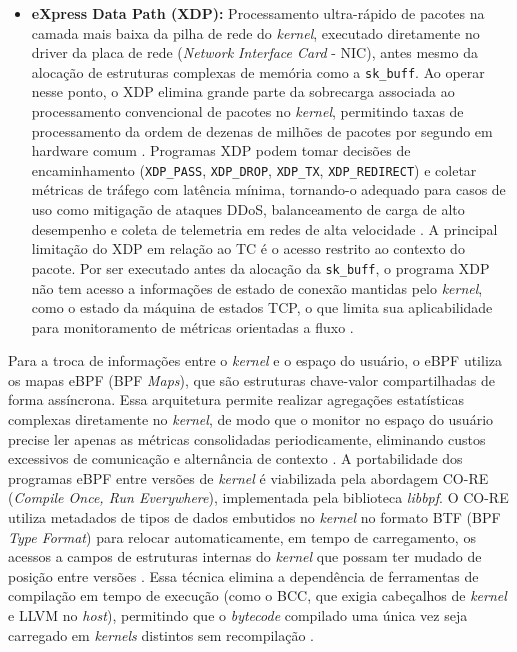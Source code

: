 \begin{itemize}
    \item \textbf{eXpress Data Path (XDP):} Processamento ultra-rápido de pacotes na camada mais baixa da pilha de rede do \textit{kernel}, executado diretamente no driver da placa de rede (\textit{Network Interface Card} - NIC), antes mesmo da alocação de estruturas complexas de memória como a \texttt{sk\_buff}. Ao operar nesse ponto, o XDP elimina grande parte da sobrecarga associada ao processamento convencional de pacotes no \textit{kernel}, permitindo taxas de processamento da ordem de dezenas de milhões de pacotes por segundo em hardware comum \cite{10.1145/3594255.3594256}. Programas XDP podem tomar decisões de encaminhamento (\texttt{XDP\_PASS}, \texttt{XDP\_DROP}, \texttt{XDP\_TX}, \texttt{XDP\_REDIRECT}) e coletar métricas de tráfego com latência mínima, tornando-o adequado para casos de uso como mitigação de ataques DDoS, balanceamento de carga de alto desempenho e coleta de telemetria em redes de alta velocidade \cite{technologies12080122, 10.1145/3594255.3594256}. A principal limitação do XDP em relação ao TC é o acesso restrito ao contexto do pacote. Por ser executado antes da alocação da \texttt{sk\_buff}, o programa XDP não tem acesso a informações de estado de conexão mantidas pelo \textit{kernel}, como o estado da máquina de estados TCP, o que limita sua aplicabilidade para monitoramento de métricas orientadas a fluxo \cite{gregg_bpf_2019, shahinfar2025demystifying}.
\end{itemize}

Para a troca de informações entre o \textit{kernel} e o espaço do usuário, o eBPF utiliza os mapas eBPF (BPF \textit{Maps}), que são estruturas chave-valor compartilhadas de forma assíncrona. Essa arquitetura permite realizar agregações estatísticas complexas diretamente no \textit{kernel}, de modo que o monitor no espaço do usuário precise ler apenas as métricas consolidadas periodicamente, eliminando custos excessivos de comunicação e alternância de contexto \cite{gregg_bpf_2019}. A portabilidade dos programas eBPF entre versões de \textit{kernel} é viabilizada pela abordagem CO-RE (\textit{Compile Once, Run Everywhere}), implementada pela biblioteca \textit{libbpf}. O CO-RE utiliza metadados de tipos de dados embutidos no \textit{kernel} no formato BTF (BPF \textit{Type Format}) para relocar automaticamente, em tempo de carregamento, os acessos a campos de estruturas internas do \textit{kernel} que possam ter mudado de posição entre versões \cite{nakryiko2020core}. Essa técnica elimina a dependência de ferramentas de compilação em tempo de execução (como o BCC, que exigia cabeçalhos de \textit{kernel} e LLVM no \textit{host}), permitindo que o \textit{bytecode} compilado uma única vez seja carregado em \textit{kernels} distintos sem recompilação \cite{nakryiko2020core, gregg_bpf_2019}.

